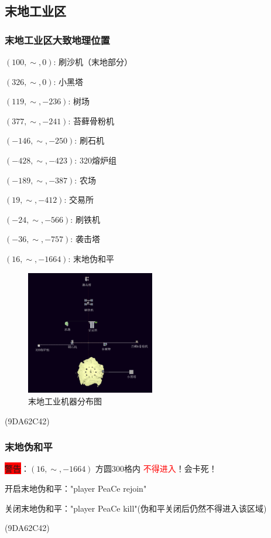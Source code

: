 \documentclass[UTF8,a4paper]{article}
\begin{document}
		\subsection{末地工业区}
			\subsubsection{末地工业区大致地理位置}
				\par $(100,\sim,0)$: 刷沙机（末地部分）
				\par $(326,\sim,0)$: 小黑塔
				\par $(119,\sim,-236)$: 树场
				\par $(377,\sim,-241)$: 苔藓骨粉机
				\par $(-146,\sim,-250)$: 刷石机
				\par $(-428,\sim,-423)$: 320熔炉组
				\par $(-189,\sim,-387)$: 农场
				\par $(19,\sim,-412)$: 交易所
				\par $(-24,\sim,-566)$: 刷铁机
				\par $(-36,\sim,-757)$: 袭击塔
				\par $(16,\sim,-1664)$: 末地伪和平
				\begin{figure}[H] %
					\centering %
					\includegraphics[width=0.5\textwidth]{./Pictures/theendbasement.png} %
					\caption{末地工业机器分布图} %
				\end{figure}
				\begin{flushright}(9DA62C42)\end{flushright}
			\subsubsection{末地伪和平}
				\par \colorbox{red}{警告}：$(16,\sim,-1664)$ 方圆300格内 \textcolor{red}{不得进入}！会卡死！
				\par 开启末地伪和平："player PeaCe rejoin"
				\par 关闭末地伪和平："player PeaCe kill"(伪和平关闭后仍然不得进入该区域)
				\begin{flushright}(9DA62C42)\end{flushright}
\end{document}
